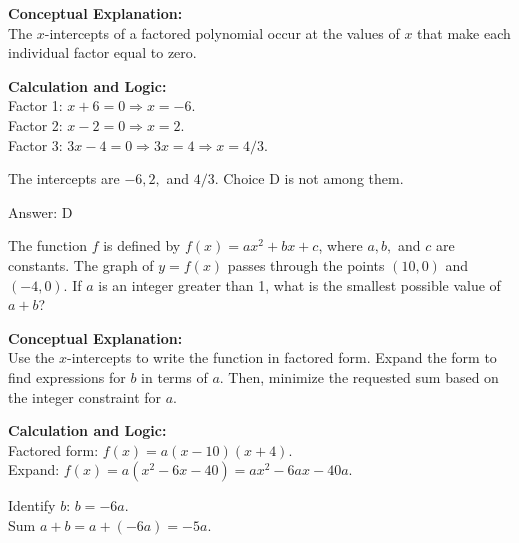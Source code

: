 \documentclass[11pt,paper=a4,answers]{exam}
\begin{document}
\begin{questions}
\begin{solution}
\textbf{Conceptual Explanation:} \\
The $x$-intercepts of a factored polynomial occur at the values of $x$ that make each individual factor equal to zero.

\vspace{20pt}

\textbf{Calculation and Logic:} \\
Factor 1: $x + 6 = 0 \Rightarrow x = -6$. \\
Factor 2: $x - 2 = 0 \Rightarrow x = 2$. \\
Factor 3: $3x - 4 = 0 \Rightarrow 3x = 4 \Rightarrow x = 4/3$.

\vspace{10pt}

The intercepts are $-6, 2,$ and $4/3$. Choice D is not among them.

\vspace{25pt}

Answer: \colorbox{yellow!100}{D}
\end{solution}

\vspace{40pt}

\question
The function $f$ is defined by $f(x) = ax^2 + bx + c$, where $a, b,$ and $c$ are constants. The graph of $y = f(x)$ passes through the points $(10, 0)$ and $(-4, 0)$. If $a$ is an integer greater than 1, what is the smallest possible value of $a + b$?

\begin{solution}
\textbf{Conceptual Explanation:} \\
Use the $x$-intercepts to write the function in factored form. Expand the form to find expressions for $b$ in terms of $a$. Then, minimize the requested sum based on the integer constraint for $a$.

\vspace{20pt}

\textbf{Calculation and Logic:} \\
Factored form: $f(x) = a(x - 10)(x + 4)$. \\
Expand: $f(x) = a(x^2 - 6x - 40) = ax^2 - 6ax - 40a$.

\vspace{10pt}

Identify $b$: $b = -6a$. \\
Sum $a + b = a + (-6a) = -5a$.


\end{solution}
\end{questions}
\end{document}
